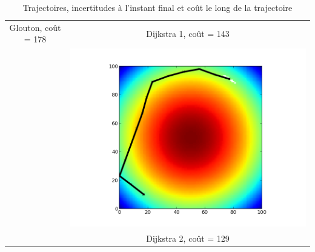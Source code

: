 \begin{table}
\begin{tabular}{cc}
Glouton, coût = 178&Dijkstra 1, coût = 143\\
&\includegraphics[scale=0.42]{../data/gradient_dijkstra_cone_2/plot_A_10_17_B_91_77_iteration_013.png} \\
&Dijkstra 2, coût = 129\\
\end{tabular}
\caption{Trajectoires, incertitudes à l'instant final et coût le long de la trajectoire}
\label{tab_cone}
\end{table}
